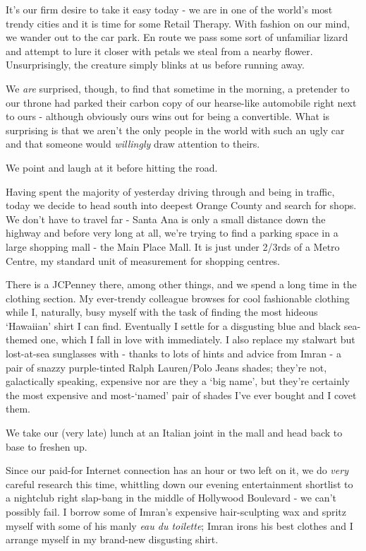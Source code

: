 \documentclass[a5paper,titlepage,11pt]{book}
\begin{document}
It's our firm desire to take it easy today - we are in one of the world's most trendy cities and it is time for some Retail Therapy. With fashion on our mind, we wander out to the car park. En route we pass some sort of unfamiliar lizard and attempt to lure it closer with petals we steal from a nearby flower. Unsurprisingly, the creature simply blinks at us before running away.

We \emph{are} surprised, though, to find that sometime in the morning, a pretender to our throne had parked their carbon copy of our hearse-like automobile right next to ours - although obviously ours wins out for being a convertible. What is surprising is that we aren't the only people in the world with such an ugly car and that someone would \emph{willingly} draw attention to theirs.

We point and laugh at it before hitting the road.

Having spent the majority of yesterday driving through and being in traffic, today we decide to head south into deepest Orange County and search for shops. We don't have to travel far - Santa Ana is only a small distance down the highway and before very long at all, we're trying to find a parking space in a large shopping mall - the Main Place Mall. It is just under 2/3rds of a Metro Centre, my standard unit of measurement for shopping centres.

There is a JCPenney there, among other things, and we spend a long time in the clothing section. My ever-trendy colleague browses for cool fashionable clothing while I, naturally, busy myself with the task of finding the most hideous `Hawaiian' shirt I can find. Eventually I settle for a disgusting blue and black sea-themed one, which I fall in love with immediately. I also replace my stalwart but lost-at-sea sunglasses with - thanks to lots of hints and advice from Imran - a pair of snazzy purple-tinted Ralph Lauren/Polo Jeans shades; they're not, galactically speaking, expensive nor are they a `big name', but they're certainly the most expensive and most-`named' pair of shades I've ever bought and I covet them.

We take our (very late) lunch at an Italian joint in the mall and head back to base to freshen up.

 Since our paid-for Internet connection has an hour or two left on it, we do \emph{very} careful research this time, whittling down our evening entertainment shortlist to a nightclub right slap-bang in the middle of Hollywood Boulevard - we can't possibly fail. I borrow some of Imran's expensive hair-sculpting wax and spritz myself with some of his manly \emph{eau du toilette}; Imran irons his best clothes and I arrange myself in my brand-new disgusting shirt.
\end{document}
